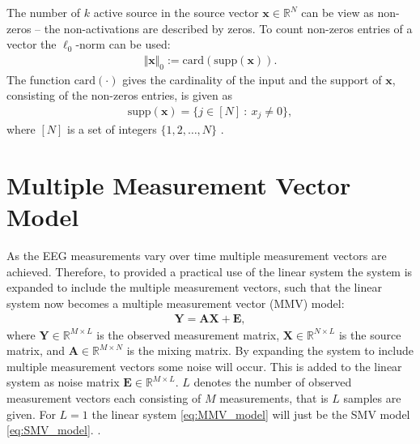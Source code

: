 The number of $k$ active source in the source vector $\mathbf{x} \in \mathbb{R}^N$ can be view as non-zeros -- the non-activations are described by zeros. To count non-zeros entries of a vector the $\ell_0$-norm can be used:
\begin{align*}
\Vert \mathbf{x} \Vert_0 := \text{card}(\text{supp}(\mathbf{x})).
\end{align*}
The function $\text{card}(\cdot)$ gives the cardinality of the input and the support of $\mathbf{x}$, consisting of the non-zeros entries, is given as
\begin{align*}
\text{supp}(\mathbf{x}) = \{ j \in [N] \ : \ x_j \neq 0 \},
\end{align*} 
where $[N]$ is a set of integers $\lbrace 1, 2, \hdots, N \rbrace$ \cite[p. 41]{FR}. 


\section{Multiple Measurement Vector Model}\label{sec:MMV}
As the EEG measurements vary over time multiple measurement vectors are achieved. Therefore, to provided a practical use of the linear system the system is expanded to include the multiple measurement vectors, such that the linear system now becomes a multiple measurement vector (MMV) model:
\begin{align}\label{eq:MMV_model}
\mathbf{Y} = \mathbf{AX}+\textbf{E},
\end{align}
where $\mathbf{Y} \in \mathbb{R}^{M \times L}$ is the observed measurement matrix, $\mathbf{X} \in \mathbb{R}^{N \times L}$ is the source matrix, and $\mathbf{A} \in \mathbb{R}^{M \times N}$ is the mixing matrix. By expanding the system to include multiple measurement vectors some noise will occur. This is added to the linear system as noise matrix $\textbf{E} \in \mathbb{R}^{M \times L}$. $L$ denotes the number of observed measurement vectors each consisting of $M$ measurements, that is $L$ samples are given. For $L = 1$ the linear system \eqref{eq:MMV_model} will just be the SMV model \eqref{eq:SMV_model}. .



